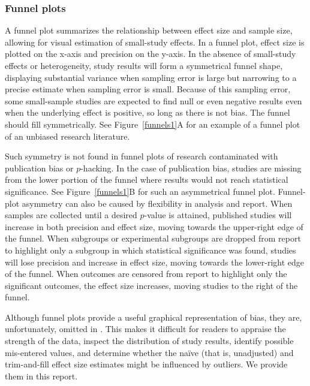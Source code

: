 \documentclass[man]{apa6}
\begin{document}
\subsubsection{Funnel plots}
A funnel plot summarizes the relationship between effect size and sample size, allowing for visual estimation of small-study effects. In a funnel plot, effect size is plotted on the x-axis and precision on the y-axis. In the absence of small-study effects or heterogeneity, study results will form a symmetrical funnel shape, displaying substantial variance when sampling error is large but narrowing to a precise estimate when sampling error is small. Because of this sampling error, some small-sample studies are expected to find null or even negative results even when the underlying effect is positive, so long as there is not bias. The funnel should fill symmetrically. See Figure~\ref{funnels1}A for an example of a funnel plot of an unbiased research literature.

Such symmetry is not found in funnel plots of research contaminated with publication bias or $p$-hacking.  In the case of publication bias, studies are missing from the lower portion of the funnel where results would not reach statistical significance. See Figure~\ref{funnels1}B for such an asymmetrical funnel plot. Funnel-plot asymmetry can also be caused by flexibility in analysis and report. When samples are collected until a desired $p$-value is attained, published studies will increase in both precision and effect size, moving towards the upper-right edge of the funnel. When subgroups or experimental subgroups are dropped from report to highlight only a subgroup in which statistical significance was found, studies will lose precision and increase in effect size, moving towards the lower-right edge of the funnel. When outcomes are censored from report to highlight only the significant outcomes, the effect size increases, moving studies to the right of the funnel.   %

Although funnel plots provide a useful graphical representation of bias, they are, unfortunately, omitted in \citet{Anderson:etal:2010}.  This makes it difficult for readers to appraise the strength of the data, inspect the distribution of study results, identify possible mis-entered values, and determine whether the na{\"i}ve (that is, unadjusted) and trim-and-fill effect size estimates might be influenced by outliers. We provide them in this report. 
\end{document}
